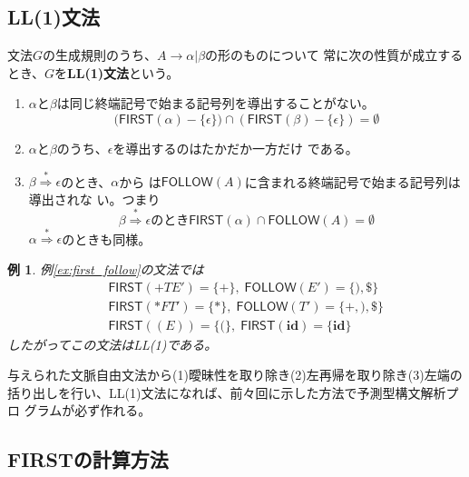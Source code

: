 \documentclass[a4j,10pt]{jsarticle}
\newtheorem{example}{例}
\begin{document}
\subsection{LL(1)文法}

文法$G$の生成規則のうち、$A \rightarrow \alpha | \beta$の形のものについて
常に次の性質が成立するとき、$G$を\textbf{LL(1)文法}という。
\begin{enumerate}
 \item $\alpha$と$\beta$は同じ終端記号で始まる記号列を導出することがない。
       \[
       (\mathsf{FIRST(\alpha) - \{\epsilon\}) \cap
       (\mathsf{FIRST}(\beta) - \{\epsilon\}) = \emptyset}
       \]
 \item $\alpha$と$\beta$のうち、$\epsilon$を導出するのはたかだか一方だけ
       である。
 \item $\beta \stackrel{*}{\Rightarrow} \epsilon$のとき、$\alpha$から
       は$\mathsf{FOLLOW}(A)$に含まれる終端記号で始まる記号列は導出されな
       い。つまり
       \[
	\beta \stackrel{*}{\Rightarrow} \epsilon のとき 
       \mathsf{FIRST}(\alpha) \cap \mathsf{FOLLOW}(A) = \emptyset
       \]
       $\alpha \stackrel{*}{\Rightarrow} \epsilon$のときも同様。
\end{enumerate}

\begin{screen}
\begin{example}
 例\ref{ex:first_follow}の文法では
 \begin{eqnarray*}
  & & \mathsf{FIRST}(+TE') = \{+\},\; \mathsf{FOLLOW}(E') = \{), \$\} \\
  & & \mathsf{FIRST}(*FT') = \{*\},\; \mathsf{FOLLOW}(T') = \{+, ),
   \$\} \\
  & & \mathsf{FIRST}((E)) = \{(\},\; \mathsf{FIRST}(\mathbf{id}) = \{\mathbf{id}\}
 \end{eqnarray*}
 したがってこの文法はLL(1)である。
\end{example}
\end{screen}

与えられた文脈自由文法から(1)曖昧性を取り除き(2)左再帰を取り除き(3)左端の
括り出しを行い、LL(1)文法になれば、前々回に示した方法で予測型構文解析プロ
グラムが必ず作れる。

\subsection{FIRSTの計算方法}
\end{document}
